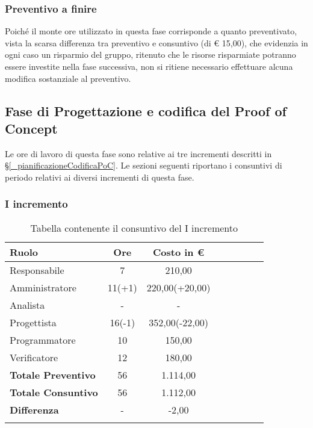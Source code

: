 \subsubsection{Preventivo a finire}
Poiché il monte ore utilizzato in questa fase corrisponde a quanto preventivato, vista la scarsa differenza tra preventivo e consuntivo (di € 15,00), che evidenzia in ogni caso un risparmio del gruppo, ritenuto che le risorse risparmiate potranno essere investite nella fase successiva, non si ritiene necessario effettuare alcuna modifica sostanziale al preventivo.



\subsection{Fase di Progettazione e codifica del Proof of Concept} \label{_consuntivoPoC}
Le ore di lavoro di questa fase sono relative ai tre incrementi descritti in \S\ref{_pianificazioneCodificaPoC}.
Le sezioni seguenti riportano i consuntivi di periodo relativi ai diversi incrementi di questa fase.

\subsubsection{I incremento} \label{_consuntivoPoC1}
\begin{longtable}{|l|c|c|c|c|c|c|c|}
	\hline
	\rowcolor{lighter-grayer}
	\textbf{Ruolo}             & \textbf{Ore} & \textbf{Costo in €} \\
	\hline
	\endfirsthead

	\hline
	Responsabile               & 7           & 210,00              \\
	\hline
	\hline
	Amministratore             & 11(+1)       & 220,00(+20,00)      \\
	\hline
	\hline
	Analista                   & -       & -   \\
	\hline
	\hline
	Progettista                & 16(-1)            & 352,00(-22,00)              \\
	\hline
	\hline
	Programmatore              & 10            & 150,00                   \\
	\hline
	\hline
	Verificatore               & 12       & 180,00    \\
	\hline
	\textbf{Totale Preventivo} & 56          & 1.114,00            \\
	\hline
	\hline
	\textbf{Totale Consuntivo} & 56          & 1.112,00            \\
	\hline
	\hline
	\textbf{Differenza}        & -           & -2,00           \\
	\hline
	\rowcolor{white}
	\caption{Tabella contenente il consuntivo del I incremento}
\end{longtable}
